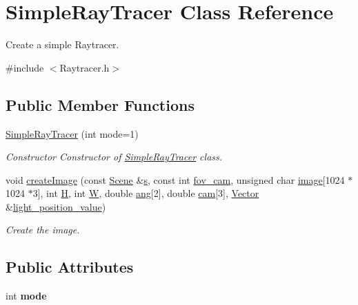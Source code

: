\hypertarget{classSimpleRayTracer}{}\section{Simple\+Ray\+Tracer Class Reference}
\label{classSimpleRayTracer}


Create a simple Raytracer.  




{\ttfamily \#include $<$Raytracer.\+h$>$}

\subsection*{Public Member Functions}
\begin{DoxyCompactItemize}
\item 
\hyperlink{classSimpleRayTracer_aec30e74e21fea028c25a37fc5d9278d2}{Simple\+Ray\+Tracer} (int mode=1)
\begin{DoxyCompactList}\small\item\em Constructor Constructor of \hyperlink{classSimpleRayTracer}{Simple\+Ray\+Tracer} class. \end{DoxyCompactList}\item 
void \hyperlink{classSimpleRayTracer_ac47615738da770c6799d018a95e8cffd}{create\+Image} (const \hyperlink{classScene}{Scene} \&\hyperlink{test_8cpp_aecc1396fc611f6e71d5d70228e7b089a}{s}, const int \hyperlink{test_8cpp_afac324b61ac0563c734fcdb81d98e344}{fov\+\_\+cam}, unsigned char \hyperlink{test_8cpp_a92ebae258b9cd4407b2510c3d18633ee}{image}\mbox{[}1024 $\ast$1024 $\ast$3\mbox{]}, int \hyperlink{test_8cpp_affa487e8e3cc48473cfc05c0ce0165e9}{H}, int \hyperlink{test_8cpp_a2dd51e03005d5cb52315290d27f61870}{W}, double \hyperlink{test_8cpp_a861ee06bf1e430650b4437260a119635}{ang}\mbox{[}2\mbox{]}, double \hyperlink{test_8cpp_a9fe883a18727d129289b149e5f0305eb}{cam}\mbox{[}3\mbox{]}, \hyperlink{classVector}{Vector} \&\hyperlink{test_8cpp_a7e3f38517518eb6f7e4744b4fe12fcd2}{light\+\_\+position\+\_\+value})
\begin{DoxyCompactList}\small\item\em Create the image. \end{DoxyCompactList}\end{DoxyCompactItemize}
\subsection*{Public Attributes}
\begin{DoxyCompactItemize}
\item 
\mbox{\label{classSimpleRayTracer_ab2d25b3a9492313cddebc55af8ffae15}} 
int {\bfseries mode}
\end{DoxyCompactItemize}


